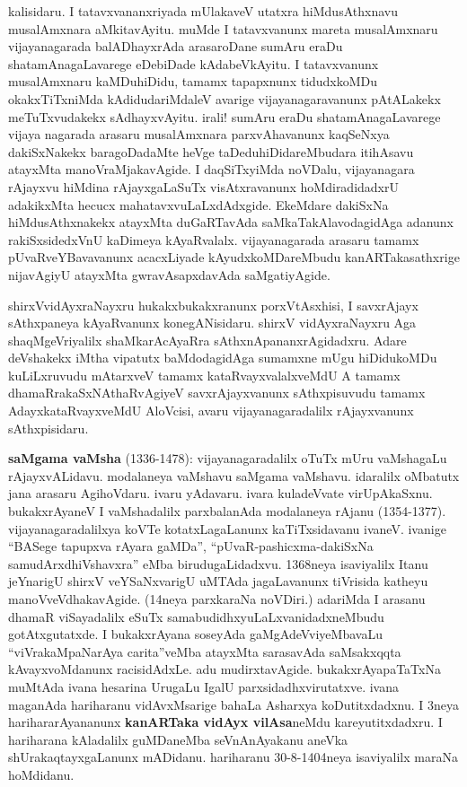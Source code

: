 \documentclass[11pt,a4size]{article}
\begin{document}
kalisidaru. I tatavxvananxriyada mUlakaveV utatxra hiMdusAthxnavu
musalAmxnara aMkitavAyitu. muMde I tatavxvanunx mareta musalAmxnaru
vijayanagarada balADhayxrAda arasaroDane sumAru eraDu 
shatamAnagaLavarege eDebiDade kAdabeVkAyitu. I tatavxvanunx
musalAmxnaru kaMDuhiDidu, tamamx tapapxnunx tidudxkoMDu okakxTiTxniMda
kAdidudariMdaleV avarige vijayanagaravanunx pAtALakekx meTuTxvudakekx
sAdhayxvAyitu. irali! sumAru eraDu shatamAnagaLavarege vijaya nagarada
arasaru musalAmxnara parxvAhavanunx kaqSeNxya dakiSxNakekx
baragoDadaMte heVge taDeduhiDidareMbudara itihAsavu atayxMta
manoVraMjakavAgide. I daqSiTxyiMda noVDalu, vijayanagara rAjayxvu
hiMdina rAjayxgaLaSuTx visAtxravanunx hoMdiradidadxrU adakikxMta
hecucx mahatavxvuLaLxdAdxgide. EkeMdare dakiSxNa hiMdusAthxnakekx
atayxMta duGaRTavAda saMkaTakAlavodagidAga adanunx rakiSxsidedxVnU
kaDimeya kAyaRvalalx. vijayanagarada arasaru tamamx pUvaRveYBavavanunx
acacxLiyade kAyudxkoMDareMbudu kanARTakasathxrige nijavAgiyU atayxMta
gwravAsapxdavAda saMgatiyAgide. 

shirxVvidAyxraNayxru
 hukakxbukakxranunx porxVtAsxhisi, I savxrAjayx
sAthxpaneya kAyaRvanunx konegANisidaru. shirxV vidAyxraNayxru
 Aga
shaqMgeVriyalilx shaMkarAcAyaRra sAthxnApananxrAgidadxru. Adare
deVshakekx iMtha vipatutx baMdodagidAga sumamxne mUgu hiDidukoMDu
kuLiLxruvudu mAtarxveV tamamx kataRvayxvalalxveMdU A tamamx
dhamaRrakaSxNAthaRvAgiyeV savxrAjayxvanunx sAthxpisuvudu tamamx
AdayxkataRvayxveMdU AloVcisi, avaru vijayanagaradalilx rAjayxvanunx
sAthxpisidaru.

\textbf{saMgama vaMsha} (1336-1478): vijayanagaradalilx oTuTx mUru
vaMshagaLu rAjayxvALidavu. modalaneya vaMshavu saMgama
vaMshavu. idaralilx oMbatutx jana arasaru AgihoVdaru. ivaru
yAdavaru. ivara kuladeVvate virUpAkaSxnu. bukakxrAyaneV I vaMshadalilx
parxbalanAda modalaneya rAjanu (1354-1377). vijayanagaradalilxya koVTe
kotatxLagaLanunx kaTiTxsidavanu ivaneV. ivanige ``BASege tapupxva
rAyara gaMDa'', ``pUvaR-pashicxma-dakiSxNa samudArxdhiVshavxra'' eMba
birudugaLidadxvu. 1368neya isaviyalilx Itanu jeYnarigU shirxV
veYSaNxvarigU uMTAda jagaLavanunx tiVrisida katheyu
manoVveVdhakavAgide. (14neya parxkaraNa noVDiri.) adariMda I arasanu
dhamaR viSayadalilx eSuTx samabudidhxyuLaLxvanidadxneMbudu
gotAtxgutatxde. I bukakxrAyana soseyAda gaMgAdeVviyeMbavaLu
``viVrakaMpaNarAya carita''veMba atayxMta sarasavAda saMsakxqqta
kAvayxvoMdanunx racisidAdxLe. adu mudirxtavAgide. bukakxrAyapaTaTxNa
muMtAda ivana hesarina UrugaLu IgalU parxsidadhxvirutatxve. ivana
maganAda hariharanu vidAvxMsarige bahaLa Asharxya koDutitxdadxnu. I
3neya harihararAyananunx \textbf{kanARTaka vidAyx vilAsa}neMdu
kareyutitxdadxru. I hariharana kAladalilx guMDaneMba seVnAnAyakanu
aneVka shUrakaqtayxgaLanunx mADidanu. hariharanu 30-8-1404neya
isaviyalilx maraNa hoMdidanu.
\end{document}
